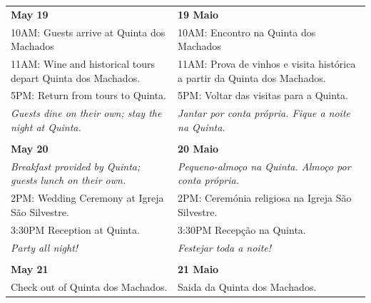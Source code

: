 \documentclass[6pt]{article}
\begin{document}
\pagestyle{empty}

\small 
\begin{tabular}{p{2.25in}|p{2.25in}}
  \textbf{May 19} & \textbf{19 Maio} \\
  {10AM:} Guests arrive at Quinta dos Machados
  &
  {10AM:} Encontro na Quinta dos Machados\\
  {11AM:} Wine and historical tours depart Quinta dos Machados. 
  &
  {11AM:} Prova de vinhos e visita histórica a partir da Quinta dos Machados.\\
  {5PM:} Return from tours to Quinta.
  &
  {5PM:} Voltar das visitas para a Quinta.
  \\
  {\it Guests dine on their own; stay the night at Quinta.}
  &
  {\it Jantar por conta própria. Fique a noite na Quinta.}\\
  &\\
  {\bf May 20} & {\bf 20 Maio} \\
  {\it Breakfast provided by Quinta; guests lunch on their own.}
  &
  {\it Pequeno-almoço na Quinta. Almoço por conta própria.}
  \\
  {2PM:} Wedding Ceremony at Igreja São Silvestre.
  &
  {2PM}: Ceremónia religiosa na Igreja São Silvestre.
  \\
  {3:30PM} Reception at Quinta.
  &
  {3:30PM} Recepção na Quinta.
  \\
  {\it Party all night!}&{\it Festejar toda a noite!}
  \\
  &\\
  {\bf May 21} & {\bf 21 Maio} \\
  Check out of Quinta dos Machados. & Saida da Quinta dos Machados.\\
\end{tabular}
\end{document}
